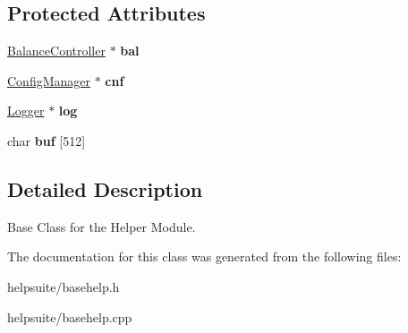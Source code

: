 \subsection*{Protected Attributes}
\begin{DoxyCompactItemize}
\item 
\mbox{\label{classBaseHelp_ac570ae3cd8a19aa602ca17e6eac202a0}} 
\mbox{\hyperlink{classBalanceController}{Balance\+Controller}} $\ast$ {\bfseries bal}
\item 
\mbox{\label{classBaseHelp_a4ebb401bf5fe43ded03eb0d392a9e30d}} 
\mbox{\hyperlink{classConfigManager}{Config\+Manager}} $\ast$ {\bfseries cnf}
\item 
\mbox{\label{classBaseHelp_a95811cc61c05016fbca8eceae00ba048}} 
\mbox{\hyperlink{classLogger}{Logger}} $\ast$ {\bfseries log}
\item 
\mbox{\label{classBaseHelp_a806640851ce9a1595261f3b203ea509a}} 
char {\bfseries buf} \mbox{[}512\mbox{]}
\end{DoxyCompactItemize}


\subsection{Detailed Description}
Base Class for the Helper Module. 

The documentation for this class was generated from the following files\+:\begin{DoxyCompactItemize}
\item 
helpsuite/basehelp.\+h\item 
helpsuite/basehelp.\+cpp\end{DoxyCompactItemize}
